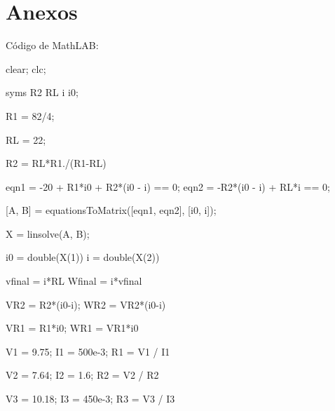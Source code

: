 \documentclass[]{article}
\begin{document}
\section{Anexos}
Código de MathLAB:

clear; clc;

syms R2 RL i i0;

R1 = 82/4;

RL = 22;

R2 = RL*R1./(R1-RL)

eqn1 = -20 + R1*i0 + R2*(i0 - i) == 0;
eqn2 = -R2*(i0 - i) + RL*i == 0;

[A, B] = equationsToMatrix([eqn1, eqn2], [i0, i]);

X = linsolve(A, B);

i0 = double(X(1))
i = double(X(2))

vfinal = i*RL
Wfinal = i*vfinal

VR2 = R2*(i0-i);
WR2 = VR2*(i0-i)

VR1 = R1*i0;
WR1 = VR1*i0

V1 = 9.75;
I1 = 500e-3;
R1 = V1 / I1

V2 = 7.64;
I2 = 1.6;
R2 = V2 / R2

V3 = 10.18;
I3 = 450e-3;
R3 = V3 / I3


\end{document}
